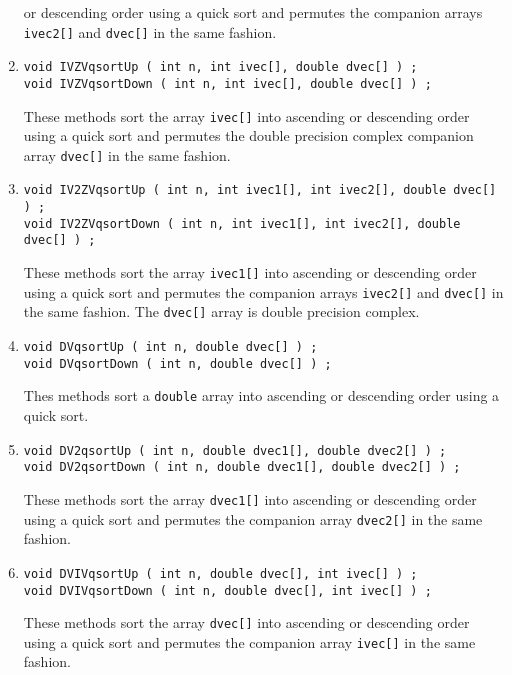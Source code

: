 \begin{enumerate}
or descending order using a quick sort and permutes the companion arrays
{\tt ivec2[]} and {\tt dvec[]} in the same fashion.
\item
\begin{verbatim}
void IVZVqsortUp ( int n, int ivec[], double dvec[] ) ;
void IVZVqsortDown ( int n, int ivec[], double dvec[] ) ;
\end{verbatim}
These methods sort the array {\tt ivec[]} into ascending or
descending order using a quick sort and permutes 
the double precision complex companion array 
{\tt dvec[]} in the same fashion.
\item
\begin{verbatim}
void IV2ZVqsortUp ( int n, int ivec1[], int ivec2[], double dvec[] ) ;
void IV2ZVqsortDown ( int n, int ivec1[], int ivec2[], double dvec[] ) ;
\end{verbatim}
These methods sort the array {\tt ivec1[]} into ascending 
or descending order using a quick sort and permutes the companion arrays
{\tt ivec2[]} and {\tt dvec[]} in the same fashion.
The {\tt dvec[]} array is double precision complex.
\item
\begin{verbatim}
void DVqsortUp ( int n, double dvec[] ) ;
void DVqsortDown ( int n, double dvec[] ) ;
\end{verbatim}
Thes methods sort a {\tt double} array into ascending or
descending order using a quick sort.
\item
\begin{verbatim}
void DV2qsortUp ( int n, double dvec1[], double dvec2[] ) ;
void DV2qsortDown ( int n, double dvec1[], double dvec2[] ) ;
\end{verbatim}
These methods sort the array {\tt dvec1[]} into ascending or
descending order using a quick sort and permutes 
the companion array {\tt dvec2[]} in the same fashion.
\item
\begin{verbatim}
void DVIVqsortUp ( int n, double dvec[], int ivec[] ) ;
void DVIVqsortDown ( int n, double dvec[], int ivec[] ) ;
\end{verbatim}
These methods sort the array {\tt dvec[]} into ascending or
descending order using a quick sort and permutes 
the companion array {\tt ivec[]} in the same fashion.
\end{enumerate}
\par
